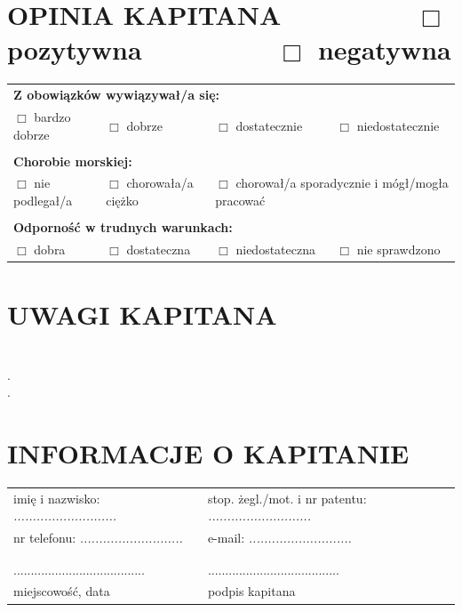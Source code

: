 \documentclass{article}
\begin{document}
\section*{OPINIA KAPITANA ~~~~~~~~ $\Box$ pozytywna ~~~~~~~~ $\Box$ negatywna}

\begin{tabularx}{\textwidth}{X X X X}
\multicolumn{4}{l}{\textbf{Z obowiązków wywiązywał/a się:}}\\
$\Box$ bardzo dobrze & $\Box$ dobrze & $\Box$ dostatecznie & $\Box$ niedostatecznie\\
\\
\multicolumn{4}{l}{\textbf{Chorobie morskiej:}}\\
$\Box$ nie podlegał/a & $\Box$ chorowała/a ciężko & \multicolumn{2}{l}{$\Box$ chorował/a sporadycznie i mógł/mogła pracować}\\
\\
\multicolumn{4}{l}{\textbf{Odporność w trudnych warunkach:}}\\
$\Box$ dobra & $\Box$ dostateczna & $\Box$ niedostateczna & $\Box$ nie sprawdzono\\
\end{tabularx}

\section*{UWAGI KAPITANA}


\textit{}\dotfill \\
.\dotfill \\
.\dotfill \\
\section*{INFORMACJE O KAPITANIE}

\begin{tabularx}{\textwidth}{X X}
imię i nazwisko: \textit{...........................} & stop. żegl./mot. i nr patentu: \textit{...........................}\\
nr telefonu: \textit{...........................} & e-mail: \textit{...........................}\\
\\\\
...................................... & ......................................\\
miejscowość, data & podpis kapitana\\
\end{tabularx}
\end{document}
